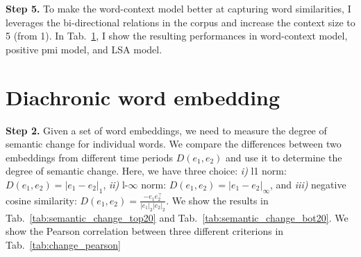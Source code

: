 \documentclass[a4paper]{article}
\theoremstyle{plain}
\theoremstyle{definition}
\begin{document}
\begin{table}[h]
\caption{Analogy Test results.}
\label{tab:acc}
\end{table}


\noindent\textbf{Step 5.} To make the word-context model better at capturing word similarities, I leverages the bi-directional relations in the corpus and increase the context size to 5 (from 1). In Tab.~\ref{}, I show the resulting performances in word-context model, positive pmi model, and LSA model.

\section{Diachronic word embedding}

\noindent\textbf{Step 2.} Given a set of word embeddings, we need to measure the degree of semantic change for individual words. 
We compare the differences between two embeddings from different time periods $D(e_1, e_2)$ and use it to determine the degree of semantic change.
Here, we have three choice: \textit{i)} l1 norm: $D(e_1, e_2) = |e_1 - e_2|_1$, \textit{ii)} l-$\infty$ norm: $D(e_1, e_2) = |e_1 - e_2|_\infty$, and \textit{iii)} negative cosine similarity: $D(e_1, e_2) = \frac{-e_1 e_2^\top}{|e_1|_2 |e_2|_2}$.
We show the results in Tab.~\ref{tab:semantic_change_top20} and Tab.~\ref{tab:semantic_change_bot20}.
We show the Pearson correlation between three different criterions in Tab.~\ref{tab:change_pearson}
\end{document}

